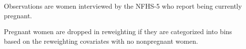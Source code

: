 \documentclass[12pt]{article}
\begin{document}



\newpage

\begin{table}[H]
    \centering

    \begin{threeparttable}
            
    \caption{: Distribution of gestational ages}
    \label{gestdur_distribution}
    \small
    \setlength{\tabcolsep}{5pt}
    
        
    
    \small
    \begin{tablenotes}
        \item  
    \end{tablenotes}

    \begin{tablenotes}
    \footnotesize
    \item 
        Observations are women interviewed by the NFHS-5 who report being currently pregnant.
    \end{tablenotes}
    
    \end{threeparttable}
\end{table}

\newpage

\begin{landscape}
    


\begin{table}[H]
    \centering
    \small %

    \begin{threeparttable}
        
    
    \caption{: Sample sizes of 3+ month pregnant women in each subgroup and the \% of pregnant women dropped to estimate pre-pregnancy underweight}
    \label{tab:sampledropped}
    \renewcommand{\arraystretch}{1.5}
    \resizebox{\textwidth}{!}{%
        
    }
    
    \begin{tablenotes}
    \footnotesize
    \item \parbox{\textwidth}{
        Pregnant women are dropped in reweighting if they are categorized into bins based on the reweighting covariates with no nonpregnant women. 
    }
    \end{tablenotes}

    \end{threeparttable}
\end{table}

\end{landscape}
\end{document}
